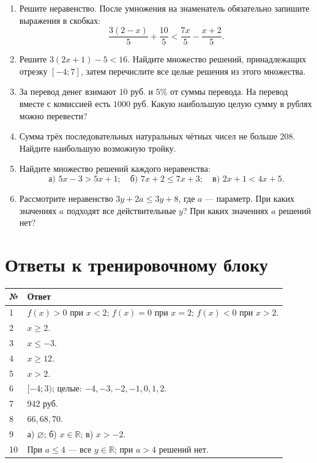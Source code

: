 \documentclass[a4paper,12pt]{article}
\newcommand{\lessonsection}[1]{\section*{#1}}
\begin{document}
\clearpage
\begin{enumerate}[label=\textbf{\arabic*.},start=5]
\item Решите неравенство. После умножения на знаменатель обязательно запишите выражения в скобках:
\[\frac{3(2-x)}5+\frac{10}5<\frac{7x}5-\frac{x+2}5.\]
\item Решите $3(2x+1)-5<16$. Найдите множество решений, принадлежащих отрезку $[-4;7]$, затем перечислите все целые решения из этого множества.
\item За перевод денег взимают $10$ руб. и $5\%$ от суммы перевода. На перевод вместе с комиссией есть $1000$ руб. Какую наибольшую целую сумму в рублях можно перевести?
\item Сумма трёх последовательных натуральных чётных чисел не больше $208$. Найдите наибольшую возможную тройку.
\item Найдите множество решений каждого неравенства:
\[
\text{а) }5x-3>5x+1;\quad
\text{б) }7x+2\le7x+3;\quad
\text{в) }2x+1<4x+5.
\]
\item Рассмотрите неравенство $3y+2a\le3y+8$, где $a$ --- параметр. При каких значениях $a$ подходят все действительные $y$? При каких значениях $a$ решений нет?
\end{enumerate}

\clearpage
\lessonsection{Ответы к тренировочному блоку}
\renewcommand{\arraystretch}{1.55}
\begin{tabularx}{\linewidth}{@{}p{1cm}X@{}}
\toprule
\textbf{№}&\textbf{Ответ}\\
\midrule
1 & $f(x)>0$ при $x<2$; $f(x)=0$ при $x=2$; $f(x)<0$ при $x>2$.\\
2 & $x\ge2$.\\
3 & $x\le-3$.\\
4 & $x\ge12$.\\
5 & $x>2$.\\
6 & $[-4;3)$; целые: $-4,-3,-2,-1,0,1,2$.\\
7 & $942$ руб.\\
8 & $66,68,70$.\\
9 & а) $\varnothing$; б) $x\in\mathbb R$; в) $x>-2$.\\
10 & При $a\le4$ --- все $y\in\mathbb R$; при $a>4$ решений нет.\\
\bottomrule
\end{tabularx}

\vspace{8mm}
\end{document}
